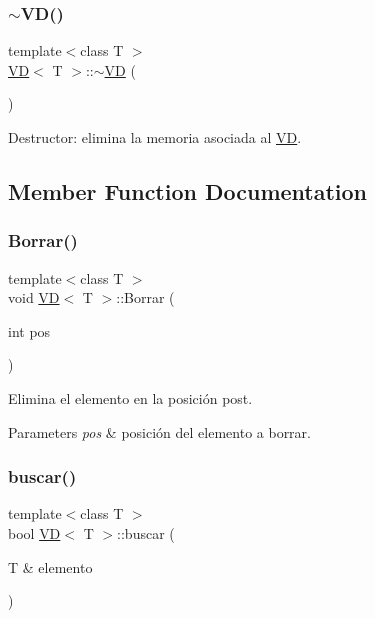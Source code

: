 \subsubsection{\texorpdfstring{$\sim$\+V\+D()}{~VD()}}
{\footnotesize\ttfamily template$<$class T $>$ \\
\mbox{\hyperlink{class_v_d}{VD}}$<$ T $>$\+::$\sim$\mbox{\hyperlink{class_v_d}{VD}} (\begin{DoxyParamCaption}{ }\end{DoxyParamCaption})}



Destructor\+: elimina la memoria asociada al \mbox{\hyperlink{class_v_d}{VD}}. 



\subsection{Member Function Documentation}
\mbox{\label{class_v_d_a13528c6fae34510d10699f426de88e27}} 
\subsubsection{\texorpdfstring{Borrar()}{Borrar()}}
{\footnotesize\ttfamily template$<$class T $>$ \\
void \mbox{\hyperlink{class_v_d}{VD}}$<$ T $>$\+::Borrar (\begin{DoxyParamCaption}\item[{int}]{pos }\end{DoxyParamCaption})}



Elimina el elemento en la posición post. 


\begin{DoxyParams}{Parameters}
{\em pos} & posición del elemento a borrar. \\
\hline
\end{DoxyParams}
\mbox{\label{class_v_d_a5e6df2f4f78a27d8ff3af5646c24bb9d}} 
\subsubsection{\texorpdfstring{buscar()}{buscar()}}
{\footnotesize\ttfamily template$<$class T $>$ \\
bool \mbox{\hyperlink{class_v_d}{VD}}$<$ T $>$\+::buscar (\begin{DoxyParamCaption}\item[{T \&}]{elemento }\end{DoxyParamCaption})}

